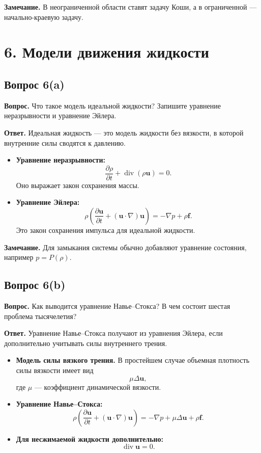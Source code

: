 \documentclass[a4paper,12pt]{article}
\newcommand{\diver}{\operatorname{div}}
\newcommand{\Question}[2]{\subsection*{Вопрос #1}\textbf{Вопрос.} #2}
\newcommand{\Answer}{\textbf{Ответ.}}
\begin{document}
\textbf{Замечание.} В неограниченной области ставят задачу Коши, а в ограниченной --- начально-краевую задачу.

\section*{6. Модели движения жидкости}

\Question{6(a)}{Что такое модель идеальной жидкости? Запишите уравнение неразрывности и уравнение Эйлера.}

\Answer
Идеальная жидкость --- это модель жидкости без вязкости, в которой внутренние силы сводятся к давлению.

\begin{itemize}
  \item \textbf{Уравнение неразрывности:}
  \[
  \frac{\partial \rho}{\partial t}+\diver(\rho\mathbf{u})=0.
  \]
  Оно выражает закон сохранения массы.

  \item \textbf{Уравнение Эйлера:}
  \[
  \rho\left(
  \frac{\partial \mathbf{u}}{\partial t}
  +(\mathbf{u}\cdot\nabla)\mathbf{u}
  \right)
  =-\nabla p+\rho\mathbf{f}.
  \]
  Это закон сохранения импульса для идеальной жидкости.
\end{itemize}

\textbf{Замечание.} Для замыкания системы обычно добавляют уравнение состояния, например $p=P(\rho)$.

\Question{6(b)}{Как выводится уравнение Навье--Стокса? В чем состоит шестая проблема тысячелетия?}

\Answer
Уравнение Навье--Стокса получают из уравнения Эйлера, если дополнительно учитывать силы внутреннего трения.

\begin{itemize}
  \item \textbf{Модель силы вязкого трения.} В простейшем случае объемная плотность силы вязкости имеет вид
  \[
  \mu\Delta\mathbf{u},
  \]
  где $\mu$ --- коэффициент динамической вязкости.

  \item \textbf{Уравнение Навье--Стокса:}
  \[
  \rho\left(
  \frac{\partial \mathbf{u}}{\partial t}
  +(\mathbf{u}\cdot\nabla)\mathbf{u}
  \right)
  =-\nabla p+\mu\Delta\mathbf{u}+\rho\mathbf{f}.
  \]

  \item \textbf{Для несжимаемой жидкости дополнительно:}
  \[
  \diver\mathbf{u}=0.
  \]
\end{itemize}
\end{document}
